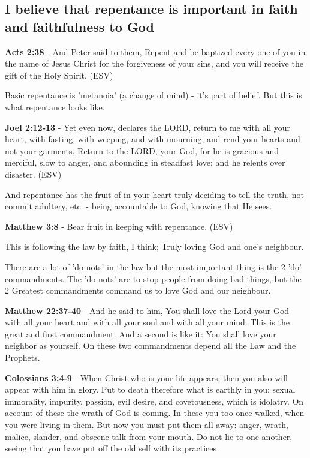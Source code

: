 \documentclass[11pt]{article}
\begin{document}
\subsection{I believe that repentance is important in faith and faithfulness to God}
\label{sec:org7a59ed2}
\textbf{Acts 2:38} - And Peter said to them, Repent and be baptized every one of you in the name of Jesus Christ for the forgiveness of your sins, and you will receive the gift of the Holy Spirit. (ESV)

Basic repentance is 'metanoia' (a change of mind) - it's part of belief.
But this is what repentance looks like.

\textbf{Joel 2:12-13} - Yet even now, declares the LORD, return to me with all your heart, with fasting, with weeping, and with mourning; and rend your hearts and not your garments. Return to the LORD, your God, for he is gracious and merciful, slow to anger, and abounding in steadfast love; and he relents over disaster. (ESV)

And repentance has the fruit of in your heart truly deciding to tell the truth, not commit adultery, etc. - being accountable to God, knowing that He sees.

\textbf{Matthew 3:8} - Bear fruit in keeping with repentance. (ESV)

This is following the law by faith, I think; Truly loving God and one's neighbour.

There are a lot of 'do nots' in the law but the most important thing is the 2 'do' commandments.
The 'do nots' are to stop people from doing bad things, but the 2 Greatest commandments command us to love God and our neighbour.

\textbf{Matthew 22:37-40} - And he said to him, You shall love the Lord your God with all your heart and with all your soul and with all your mind. This is the great and first commandment. And a second is like it: You shall love your neighbor as yourself. On these two commandments depend all the Law and the Prophets.

\textbf{Colossians 3:4-9} - When Christ who is your life appears, then you also will appear with him in glory. Put to death therefore what is earthly in you: sexual immorality, impurity, passion, evil desire, and covetousness, which is idolatry. On account of these the wrath of God is coming. In these you too once walked, when you were living in them. But now you must put them all away: anger, wrath, malice, slander, and obscene talk from your mouth. Do not lie to one another, seeing that you have put off the old self with its practices
\end{document}

